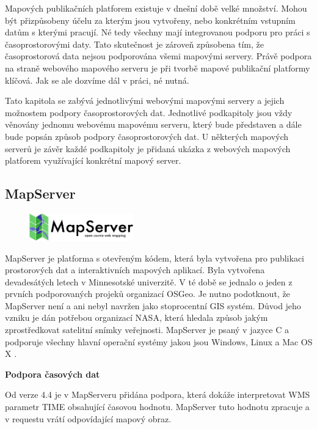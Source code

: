  Mapových publikačních platforem existuje v dnešní době velké množství. Mohou být přizpůsobeny účelu za kterým jsou vytvořeny, nebo konkrétním vstupním datům s kterými pracují. Né tedy všechny mají integrovanou podporu pro práci s časoprostorovými daty. Tato skutečnost je zároveň způsobena tím, že časoprostorová data nejsou podporována všemi mapovými servery. Právě podpora na straně webového mapového serveru je při tvorbě mapové publikační platformy klíčová. Jak se ale dozvíme dál v práci, né nutná.
 
 Tato kapitola se zabývá jednotlivými webovými mapovými servery a jejich možnostem podpory časoprostorových dat. Jednotlivé podkapitoly jsou vždy věnovány jednomu webovému mapovému serveru, který bude představen a dále bude popsán způsob podpory časoprostorových dat. U některých mapových serverů je závěr každé podkapitoly je přidaná ukázka z webových mapových platforem využívající konkrétní mapový server.

\subsection{MapServer}

\begin{figure}[h!]
	\centering
	\includegraphics[width=0.4\textwidth]{../img/mapserver-logo.png}
	\label{fig:mapserver-logo}
\end{figure}
\bigskip

MapServer je platforma s otevřeným kódem, která byla vytvořena pro publikaci prostorových dat a interaktivních mapových aplikací. Byla vytvořena devadesátých letech v Minnesotské univerzitě. V té době se jednalo o jeden z prvních podporovaných projeků organizací OSGeo. Je nutno podotknout, že MapServer není a ani nebyl navržen jako stoprocentní GIS systém. Důvod jeho vzniku je dán potřebou organizací NASA, která hledala způsob jakým zprostředkovat satelitní snímky veřejnosti. MapServer je psaný v jazyce C a podporuje všechny hlavní operační systémy jakou jsou Windows, Linux a Mac OS X \cite{mapserver_about}.

\bigskip
\noindent
\textbf{Podpora časových dat}

Od verze 4.4 je v MapServeru přidána podpora, která dokáže interpretovat WMS parametr TIME obsahující časovou hodnotu. MapServer tuto hodnotu zpracuje a v requestu vrátí odpovídající mapový obraz. 

